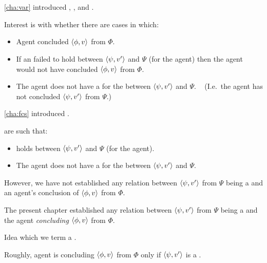 \chapter{}
\label{cha:requs}

\begin{note}
  \autoref{cha:var} introduced \qWhyV{}, \qHowV{}, and \issueConstraint{}.

  Interest is with whether there are cases in which:

  \begin{itemize}
  \item
    Agent concluded \(\langle \phi, v \rangle\) from \(\Phi\).
  \item
    If an \ros{} failed to hold between \(\langle \psi, v' \rangle\) and \(\Psi\) (for the agent) then the agent would not have concluded \(\langle \phi, v \rangle\) from \(\Phi\).
  \item
    The agent does not have a \wit{} for the \ros{} between \(\langle \psi, v' \rangle\) and \(\Psi\).%
    \mbox{ }\hfill%
    (I.e.\ the agent has not concluded \(\langle \psi, v' \rangle\) from \(\Psi\).)
  \end{itemize}
\end{note}

\begin{note}
  \autoref{cha:fcs} introduced .

   are such that:
  \begin{itemize}
  \item
    \ros{} holds between \(\langle \psi, v' \rangle\) and \(\Psi\) (for the agent).
  \item
    The agent does not have a \wit{} for the \ros{} between \(\langle \psi, v' \rangle\) and \(\Psi\).
  \end{itemize}

  However, we have not established any relation between \(\langle \psi, v' \rangle\) from \(\Psi\) being a \fc{} and an agent's conclusion of \(\langle \phi, v \rangle\) from \(\Phi\).
\end{note}

\begin{note}
  The present chapter established any relation between \(\langle \psi, v' \rangle\) from \(\Psi\) being a \fc{} and the agent \emph{concluding} \(\langle \phi, v \rangle\) from \(\Phi\).

  Idea which we term a \requ{}.

  Roughly, agent is concluding \(\langle \phi, v \rangle\) from \(\Phi\) only if \(\langle \psi, v' \rangle\) is a \fc{}.
\end{note}

